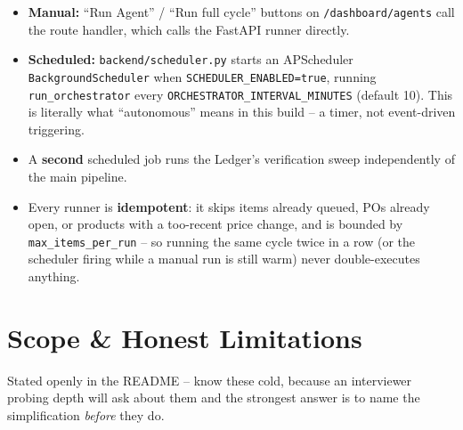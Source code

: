 \documentclass[11pt,a4paper]{article}
\begin{document}
\begin{itemize}[itemsep=2pt]
\item \textbf{Manual:} ``Run Agent'' / ``Run full cycle'' buttons on \texttt{/dashboard/agents}
call the route handler, which calls the FastAPI runner directly.
\item \textbf{Scheduled:} \texttt{backend/scheduler.py} starts an APScheduler
\texttt{BackgroundScheduler} when \texttt{SCHEDULER\_ENABLED=true}, running
\texttt{run\_orchestrator} every \texttt{ORCHESTRATOR\_INTERVAL\_MINUTES} (default 10). This
is literally what ``autonomous'' means in this build -- a timer, not event-driven triggering.
\item A \textbf{second} scheduled job runs the Ledger's verification sweep independently of
the main pipeline.
\item Every runner is \textbf{idempotent}: it skips items already queued, POs already open, or
products with a too-recent price change, and is bounded by \texttt{max\_items\_per\_run} --
so running the same cycle twice in a row (or the scheduler firing while a manual run is still
warm) never double-executes anything.
\end{itemize}

\section{Scope \& Honest Limitations}
\label{sec:limits}

Stated openly in the README -- know these cold, because an interviewer probing depth will ask
about them and the strongest answer is to name the simplification \emph{before} they do.
\end{document}
